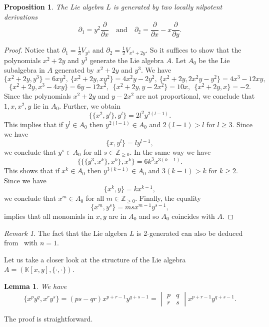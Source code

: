 \documentclass[a4paper,draft,reqno,12pt]{amsart}
\newtheorem{proposition}[theorem]{Proposition}
\newtheorem{lemma}[theorem]{Lemma}
\theoremstyle{definition}
\theoremstyle{remark}
\newtheorem {remark}[theorem]{Remark}
\def\KK{{\mathbb K}}
\def\ZZ{{\mathbb Z}}
\renewcommand{\ge}{\geqslant}
\begin{document}
\begin{proposition} \label{pfirst}
The Lie algebra $L$ is generated by two locally nilpotent derivations 
$$
\partial_1= y^2\frac{\partial}{\partial x} \quad \text{and} \quad \partial_2= \frac{\partial}{\partial x}-x\frac{\partial}{\partial y}.
$$
\end{proposition} 

\begin{proof}
Notice that $\partial_1= \frac{1}{3}V_{y^3}$ and $\partial_2=\frac{1}{2}V_{x^2+2y}$. So it suffices to show that the polynomials $x^2+2y$ and $y^3$ generate the Lie algebra $A$. 
Let $A_0$ be the Lie subalgebra in $A$ generated by $x^2+2y$ and $y^3$. We have
$$
\{x^2+2y,y^3\}=6xy^2, \ \{x^2+2y, xy^2\}=4x^2y-2y^2, \ \{x^2+2y, 2x^2y-y^2\}=4x^3-12xy,  
$$
$$
\{x^2+2y, x^3-4xy\}=6y-12x^2, \ \ \{x^2+2y,y-2x^2\}=10x, \ \ \{x^2+2y, x\}=-2.
$$
\smallskip
Since the polynomials $x^2+2y$ and $y-2x^2$ are not proportional, we conclude 
that $1,x,x^2,y$ lie in $A_0$. Further, we obtain
$$
\{\{x^2,y^l\},y^l\}=2l^2 y^{2(l-1)}.  
$$
This implies that if $y^l\in A_0$ then $y^{2(l-1)}\in A_0$ and $2(l-1)>l$ for $l\ge 3$. Since we have
$$
\{x,y^l\}=ly^{l-1},
$$
we conclude that $y^s\in A_0$ for all $s\in\ZZ_{\ge 0}$. In the same way we have 
$$
\{\{\{y^3,x^k\},x^k\},x^k\} =6 k^3 x^{3(k-1)}.  
$$
This shows that if $x^k\in A_0$ then $y^{3(k-1)}\in A_0$ and $3(k-1)>k$ for $k\ge 2$. Since we have
$$
\{x^k,y\}=kx^{k-1},
$$
we conclude that $x^m\in A_0$ for all $m\in\ZZ_{\ge 0}$. Finally, the equality
$$
\{x^m,y^s\}=msx^{m-1}y^{s-1}, 
$$
implies that all monomials in $x,y$ are in $A_0$ and so $A_0$ coincides with $A$. 
\end{proof} 

\begin{remark}
The fact that the Lie algebra $L$ is 2-generated can also be deduced from~\cite[Theorem~28]{AH} with $n=1$. 
\end{remark} 

Let us take a closer look at the structure of the Lie algebra $A=(\KK[x,y], \{\cdot, \cdot\})$. 

\begin{lemma} \label{lem1}
We have
$$
\{x^p y^q, x^r y^s\} = (p s - q r)  x^{p+r-1} y^{q+s-1} = 
\begin{vmatrix}
p & q \\ 
r & s 
\end{vmatrix} 
x^{p+r-1} y^{q+s-1} . 
$$
\end{lemma}

The proof is straightforward. 
\end{document}
